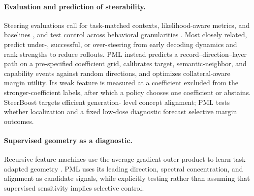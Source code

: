 \paragraph{Evaluation and prediction of steerability.}
Steering evaluations call for task-matched contexts, likelihood-aware metrics,
and baselines \citep{pres2024reliable}, and test control across behavioral
granularities \citep{xu-etal-2026-controllable}. Most closely related,
\citet{fan2026steerable} predict under-, successful, or over-steering from
early decoding dynamics and rank strengths to reduce rollouts. PML instead predicts
a record--direction--layer path on a pre-specified coefficient grid, calibrates
target, semantic-neighbor, and capability events against random directions, and
optimizes collateral-aware margin utility. Its weak feature is measured at a
coefficient excluded from the stronger-coefficient labels, after which a policy
chooses one coefficient or abstains. SteerBoost targets efficient generation-
level concept alignment; PML tests whether localization and a fixed low-dose
diagnostic forecast selective margin outcomes.

\paragraph{Supervised geometry as a diagnostic.}
Recursive feature machines use the average gradient outer product to learn
task-adapted geometry \citep{radhakrishnan2022mechanism}. PML uses its leading
direction, spectral concentration, and alignment as candidate signals, while
explicitly testing rather than assuming that supervised sensitivity implies
selective control.
